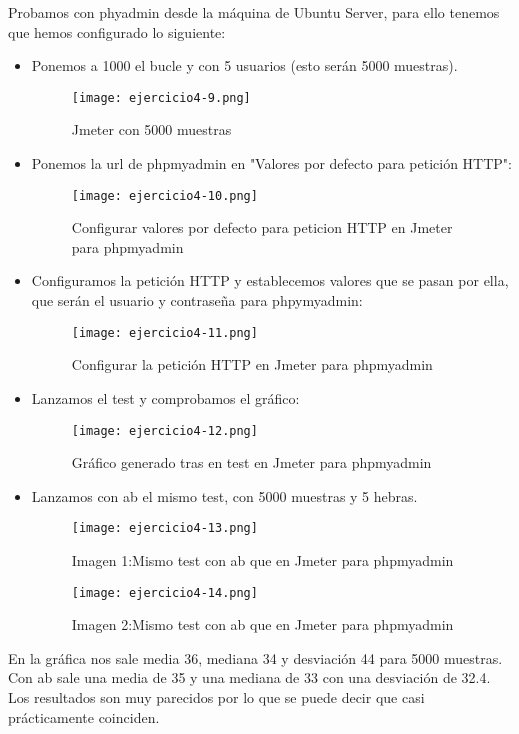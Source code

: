 	Probamos con phyadmin desde la máquina de Ubuntu Server, para ello tenemos que hemos configurado lo siguiente:
	\begin{itemize}
		\item Ponemos a 1000 el bucle y con 5 usuarios (esto serán 5000 muestras).
			\begin{figure}[H] 
				\centering
				\texttt{[image: ejercicio4-9.png]} 
				\label{figura27} 
				\caption{Jmeter con 5000 muestras}
			\end{figure}
		\item Ponemos la url de phpmyadmin en "Valores por defecto para petición HTTP":
			\begin{figure}[H] 
				\centering
				\texttt{[image: ejercicio4-10.png]} 
				\label{figura28} 
				\caption{Configurar valores por defecto para peticion HTTP en Jmeter para phpmyadmin}
			\end{figure}
		\item Configuramos la petición HTTP y establecemos valores que se pasan por ella, que serán el usuario y contraseña para phpymyadmin:
			\begin{figure}[H] 
				\centering
				\texttt{[image: ejercicio4-11.png]} 
				\label{figura29} 
				\caption{Configurar la petición HTTP en Jmeter para phpmyadmin}
			\end{figure}
		\item Lanzamos el test y comprobamos el gráfico:
			\begin{figure}[H] 
				\centering
				\texttt{[image: ejercicio4-12.png]} 
				\label{figura30} 
				\caption{Gráfico generado tras en test en Jmeter para phpmyadmin}
			\end{figure}
		\item Lanzamos con ab el mismo test, con 5000 muestras y 5 hebras.
			\begin{figure}[H] 
				\centering
				\texttt{[image: ejercicio4-13.png]} 
				\label{figura31} 
				\caption{Imagen 1:Mismo test con ab que en Jmeter para phpmyadmin}
			\end{figure}
			\begin{figure}[H] 
				\centering
				\texttt{[image: ejercicio4-14.png]} 
				\label{figura32} 
				\caption{Imagen 2:Mismo test con ab que en Jmeter para phpmyadmin}
			\end{figure}
	\end{itemize}
	
	En la gráfica nos sale media 36, mediana 34 y desviación 44 para 5000 muestras. Con ab sale una media de 35 y una mediana de 33 con una desviación de 32.4. Los resultados son muy parecidos por lo que se puede decir que casi prácticamente coinciden.
	

